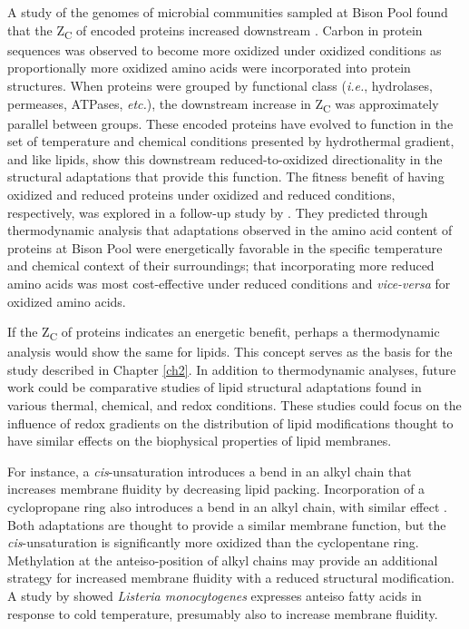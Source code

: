 A study of the genomes of microbial communities sampled at Bison Pool found that the Z\textsubscript{C} of encoded proteins increased downstream \citep{dick2011calculation}. Carbon in protein sequences was observed to become more oxidized under oxidized conditions as proportionally more oxidized amino acids were incorporated into protein structures. When proteins were grouped by functional class (\textit{i.e.}, hydrolases, permeases, ATPases, \textit{etc.}), the downstream increase in Z\textsubscript{C} was approximately parallel between groups. These encoded proteins have evolved to function in the set of temperature and chemical conditions presented by hydrothermal gradient, and like lipids, show this downstream reduced-to-oxidized directionality in the structural adaptations that provide this function. The fitness benefit of having oxidized and reduced proteins under oxidized and reduced conditions, respectively, was explored in a follow-up study by \cite{dick2013metastable}. They predicted through thermodynamic analysis that adaptations observed in the amino acid content of proteins at Bison Pool were energetically favorable in the specific temperature and chemical context of their surroundings; that incorporating more reduced amino acids was most cost-effective under reduced conditions and \textit{vice-versa} for oxidized amino acids.

If the Z\textsubscript{C} of proteins indicates an energetic benefit, perhaps a thermodynamic analysis would show the same for lipids. This concept serves as the basis for the study described in Chapter \ref{ch2}. In addition to thermodynamic analyses, future work could be comparative studies of lipid structural adaptations found in various thermal, chemical, and redox conditions. These studies could focus on the influence of redox gradients on the distribution of lipid modifications thought to have similar effects on the biophysical properties of lipid membranes.

For instance, a \textit{cis}-unsaturation introduces a bend in an alkyl chain that increases membrane fluidity by decreasing lipid packing. Incorporation of a cyclopropane ring also introduces a bend in an alkyl chain, with similar effect \citep{zhang2008membrane}. Both adaptations are thought to provide a similar membrane function, but the \textit{cis}-unsaturation is significantly more oxidized than the cyclopentane ring. Methylation at the anteiso-position of alkyl chains may provide an additional strategy for increased membrane fluidity with a reduced structural modification. A study by \citep{zhu2005precursor} showed \textit{Listeria monocytogenes} expresses anteiso fatty acids in response to cold temperature, presumably also to increase membrane fluidity.

